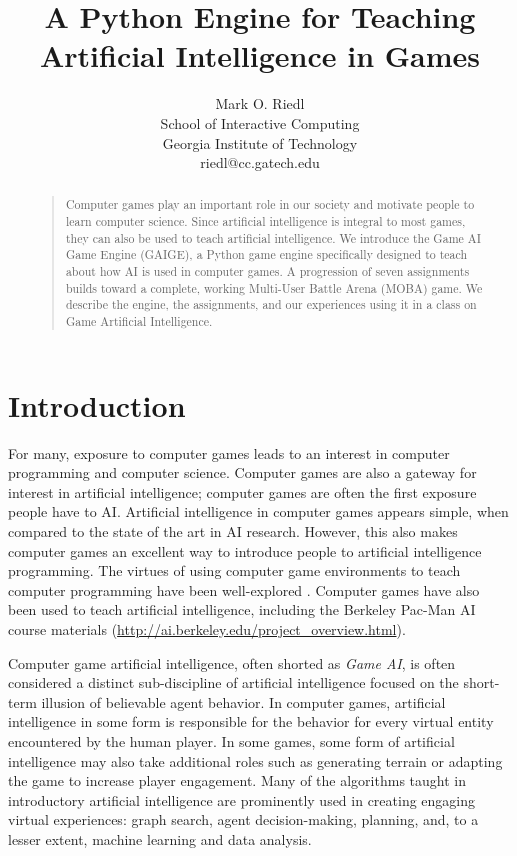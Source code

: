 \documentclass[letterpaper]{article}
\begin{document}
\title{A Python Engine for Teaching Artificial Intelligence in Games}
\author{Mark O. Riedl\\
School of Interactive Computing\\
Georgia Institute of Technology\\
riedl@cc.gatech.edu
}
\maketitle
\begin{abstract}
\begin{quote}
Computer games play an important role in our society and motivate people to learn computer science. 
Since artificial intelligence is integral to most games, they can also be used to teach artificial intelligence.
We introduce the Game AI Game Engine (GAIGE), a Python game engine specifically designed to teach about how AI is used in computer games.
A progression of seven assignments builds toward a complete, working Multi-User Battle Arena (MOBA) game.
We describe the engine, the assignments, and our experiences using it in a class on Game Artificial Intelligence.
\end{quote}
\end{abstract}



\section{Introduction}

\noindent 


For many, exposure to computer games leads to an interest in computer programming and computer science.
Computer games are also a gateway for interest in artificial intelligence; computer games are often the first exposure people have to AI.
Artificial intelligence in computer games appears simple, when compared to the state of the art in AI research.
However, this also makes computer games an excellent way to introduce people to artificial intelligence programming.
The virtues of using computer game environments to teach computer programming have been well-explored \cite{denero10,wong10,taylor11,sosnowski13}. 
Computer games have also been used to teach artificial intelligence, including the Berkeley Pac-Man AI course materials (\url{http://ai.berkeley.edu/project_overview.html}).

Computer game artificial intelligence, often shorted as {\em Game AI}, is often considered a distinct sub-discipline of artificial intelligence focused on the short-term illusion of believable agent behavior. 
In computer games, artificial intelligence in some form is responsible for the behavior for every virtual entity encountered by the human player.
In some games, some form of artificial intelligence may also take additional roles such as generating terrain or adapting the game to increase player engagement. 
Many of the algorithms taught in introductory artificial intelligence are prominently used in creating engaging virtual experiences: graph search, agent decision-making, planning, and, to a lesser extent, machine learning and data analysis. 
\end{document}
